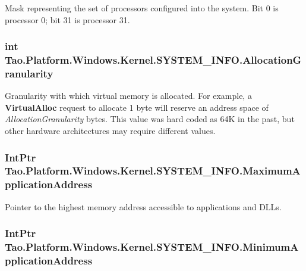 Mask representing the set of processors configured into the system. Bit 0 is processor 0; bit 31 is processor 31. 

\hypertarget{struct_tao_1_1_platform_1_1_windows_1_1_kernel_1_1_s_y_s_t_e_m___i_n_f_o_a4c5fa3e71d82e4ba21014707b3cf0f53}{
\subsubsection[{AllocationGranularity}]{\setlength{\rightskip}{0pt plus 5cm}int {\bf Tao.Platform.Windows.Kernel.SYSTEM\_\-INFO.AllocationGranularity}}}
\label{struct_tao_1_1_platform_1_1_windows_1_1_kernel_1_1_s_y_s_t_e_m___i_n_f_o_a4c5fa3e71d82e4ba21014707b3cf0f53}


Granularity with which virtual memory is allocated. For example, a {\bfseries VirtualAlloc} request to allocate 1 byte will reserve an address space of {\itshape AllocationGranularity\/} bytes. This value was hard coded as 64K in the past, but other hardware architectures may require different values. 

\hypertarget{struct_tao_1_1_platform_1_1_windows_1_1_kernel_1_1_s_y_s_t_e_m___i_n_f_o_a28e5d33f7be1fc703b3021c7175c1d3b}{
\subsubsection[{MaximumApplicationAddress}]{\setlength{\rightskip}{0pt plus 5cm}IntPtr {\bf Tao.Platform.Windows.Kernel.SYSTEM\_\-INFO.MaximumApplicationAddress}}}
\label{struct_tao_1_1_platform_1_1_windows_1_1_kernel_1_1_s_y_s_t_e_m___i_n_f_o_a28e5d33f7be1fc703b3021c7175c1d3b}


Pointer to the highest memory address accessible to applications and DLLs. 

\hypertarget{struct_tao_1_1_platform_1_1_windows_1_1_kernel_1_1_s_y_s_t_e_m___i_n_f_o_a0f0c6aa8c394aed872e003895c045ee3}{
\subsubsection[{MinimumApplicationAddress}]{\setlength{\rightskip}{0pt plus 5cm}IntPtr {\bf Tao.Platform.Windows.Kernel.SYSTEM\_\-INFO.MinimumApplicationAddress}}}
\label{struct_tao_1_1_platform_1_1_windows_1_1_kernel_1_1_s_y_s_t_e_m___i_n_f_o_a0f0c6aa8c394aed872e003895c045ee3}


